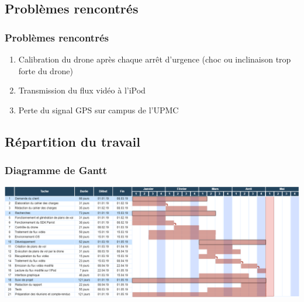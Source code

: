 \documentclass{beamer}
\begin{document}
	
	\begin{frame}
	\section{Problèmes rencontrés}
		\begin{center}
		\frametitle{Problèmes rencontrés}
        \begin{enumerate}
            \item Calibration du drone après chaque arrêt d'urgence (choc ou inclinaison trop forte du drone)
            \item Transmission du flux vidéo à l'iPod
            \item Perte du signal GPS sur campus de l'UPMC
             \end{enumerate}
		\end{center}
	\end{frame}

	
	\begin{frame}
		\section{Répartition du travail}
		\begin{center}
		\frametitle{Diagramme de Gantt}
        \includegraphics[scale=0.26]{gantt.png}
		\end{center}
	\end{frame}

	
\end{document}
